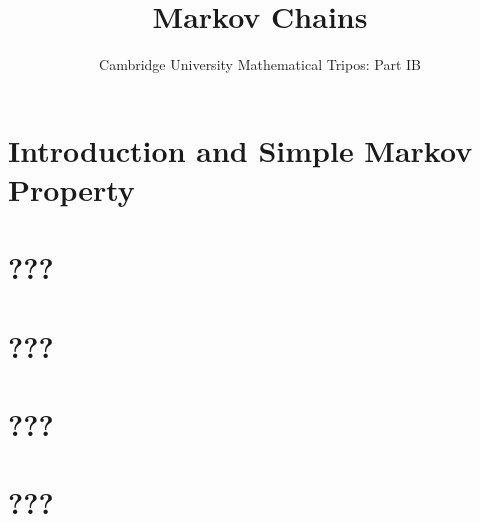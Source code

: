 \documentclass{article}
\title{Markov Chains}
\author{Cambridge University Mathematical Tripos: Part IB}
\begin{document}
\maketitle

\tableofcontentsnewpage{}

\section{Introduction and Simple Markov Property}

\section{???}

\section{???}

\section{???}

\section{???}

\end{document}
